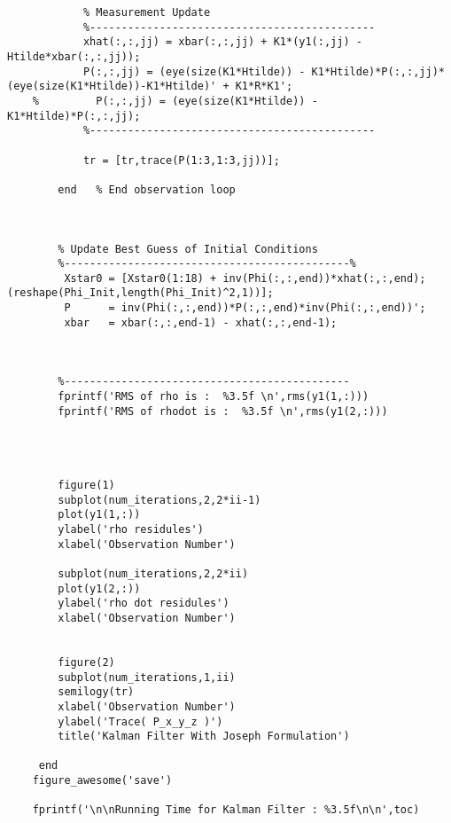 \documentclass[]{article}
\begin{document}
\begin{appendix}
\begin{lstlisting}
	        % Measurement Update
	        %---------------------------------------------
	        xhat(:,:,jj) = xbar(:,:,jj) + K1*(y1(:,jj) - Htilde*xbar(:,:,jj));
	        P(:,:,jj) = (eye(size(K1*Htilde)) - K1*Htilde)*P(:,:,jj)*(eye(size(K1*Htilde))-K1*Htilde)' + K1*R*K1';
	%         P(:,:,jj) = (eye(size(K1*Htilde)) - K1*Htilde)*P(:,:,jj);
	        %---------------------------------------------
	              
	        tr = [tr,trace(P(1:3,1:3,jj))];
	                                                               
	    end   % End observation loop
	    
	            
	        
	    % Update Best Guess of Initial Conditions
	    %---------------------------------------------%     
	     Xstar0 = [Xstar0(1:18) + inv(Phi(:,:,end))*xhat(:,:,end); (reshape(Phi_Init,length(Phi_Init)^2,1))];
	     P      = inv(Phi(:,:,end))*P(:,:,end)*inv(Phi(:,:,end))';
	     xbar   = xbar(:,:,end-1) - xhat(:,:,end-1);
	
	
	
	    %--------------------------------------------- 
	    fprintf('RMS of rho is :  %3.5f \n',rms(y1(1,:)))
	    fprintf('RMS of rhodot is :  %3.5f \n',rms(y1(2,:)))
	
	
	    
	    
	    figure(1)
	    subplot(num_iterations,2,2*ii-1)
	    plot(y1(1,:))
	    ylabel('rho residules')
	    xlabel('Observation Number')
	    
	    subplot(num_iterations,2,2*ii)
	    plot(y1(2,:))
	    ylabel('rho dot residules')
	    xlabel('Observation Number')
	    
	    
	    figure(2)
	    subplot(num_iterations,1,ii)
	    semilogy(tr)
	    xlabel('Observation Number')
	    ylabel('Trace( P_x_y_z )')
	    title('Kalman Filter With Joseph Formulation')
	    
	 end
	figure_awesome('save')
	
	fprintf('\n\nRunning Time for Kalman Filter : %3.5f\n\n',toc)



\end{lstlisting}
\end{appendix}
    
\end{document}
